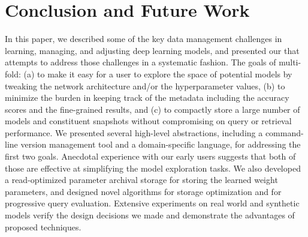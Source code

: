\documentclass[conference]{IEEEtran}
\begin{document}
\section{Conclusion and Future Work}
\label{sec:concolusion}
In this paper, we described some of the key data management challenges in learning, managing, and adjusting 
deep learning models, and presented our \modelhub\system that attempts to address those challenges in a systematic
fashion. The goals of \modelhub\are multi-fold: (a) to make it easy for a user to explore the space of 
potential models by tweaking the network architecture and/or the hyperparameter values, (b) to minimize the burden
in keeping track of the metadata including the accuracy scores and the fine-grained results, and (c) to compactly store
a large number of models and constituent snapshots without compromising on query or retrieval performance. 
We presented several high-level abstractions, including a command-line version management tool and a domain-specific
language, for addressing the first two goals. Anecdotal experience with our early users suggests that both of those are 
effective at simplifying the model exploration tasks. We also developed a read-optimized parameter archival storage for 
storing the learned weight parameters, and designed novel algorithms for storage optimization and for progressive query 
evaluation. Extensive experiments on real world and synthetic models verify the design decisions we made and demonstrate 
the advantages of proposed techniques.

\end{document}
